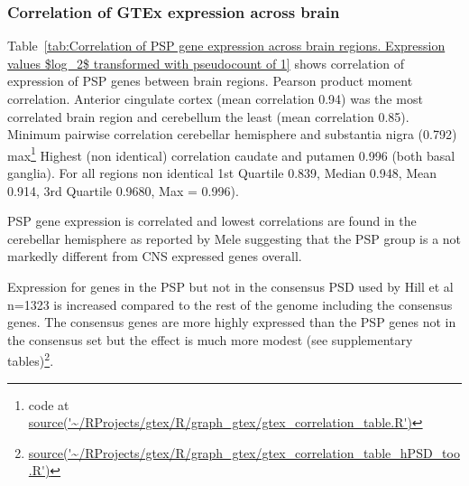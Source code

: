\subsubsection{Correlation of GTEx expression across brain}

Table~\ref{tab:Correlation of PSP gene expression across brain regions. Expression values $log_2$ transformed with pseudocount of 1} shows correlation of expression of PSP genes between brain regions. Pearson product moment correlation. Anterior cingulate cortex (mean correlation 0.94) was the most correlated brain region and cerebellum the least (mean correlation 0.85). Minimum pairwise correlation cerebellar hemisphere and substantia nigra (0.792) max\footnote{code at \url{source('~/RProjects/gtex/R/graph_gtex/gtex_correlation_table.R')}} Highest (non identical) correlation caudate and putamen 0.996 (both basal ganglia). For all regions non identical  1st Quartile 0.839, Median 0.948, Mean 0.914, 3rd Quartile 0.9680, Max = 0.996).

PSP gene expression is correlated and lowest correlations are found in the cerebellar hemisphere as reported by Mele \cite{mele2015human} suggesting that the PSP group is a not markedly different from CNS expressed genes overall. 

Expression for genes in the PSP but not in the consensus PSD used by Hill et al\cite{hill2014human} n=1323  is increased compared to the rest of the genome including the consensus genes. The consensus genes are more highly expressed than the PSP genes not in the consensus set but the effect is much more modest (see supplementary tables)\footnote{\url{source('~/RProjects/gtex/R/graph_gtex/gtex_correlation_table_hPSD_too.R')}}.



